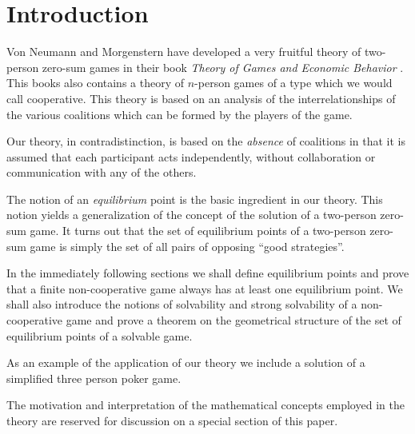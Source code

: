 \section{Introduction}
\hspace{\parindent}Von Neumann and Morgenstern have developed a very fruitful theory of two-person zero-sum games in their book \emph{Theory of Games and Economic Behavior} \cite{1}. This books also contains a theory of $n$-person games of a type which we would call cooperative. This theory is based on an analysis of the interrelationships of the various coalitions which can be formed by the players of the game.

Our theory, in contradistinction, is based on the \emph{absence} of coalitions in that it is assumed that each participant acts independently, without collaboration or communication with any of the others.

The notion of an \emph{equilibrium} point is the basic ingredient in our theory. This notion yields a generalization of the concept of the solution of a two-person zero-sum game. It turns out that the set of equilibrium points of a two-person zero-sum game is simply the set of all pairs of opposing ``good strategies''.

In the immediately following sections we shall define equilibrium points and prove that a finite non-cooperative game always has at least one equilibrium point. We shall also introduce the notions of solvability and strong solvability of a non-cooperative game and prove a theorem on the geometrical structure of the set of equilibrium points of a solvable game.

As an example of the application of our theory we include a solution of a simplified three person poker game.

The motivation and interpretation of the mathematical concepts employed in the theory are reserved for discussion on a special section of this paper.

\newpage
